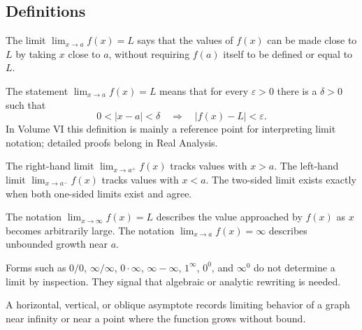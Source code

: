 \subsection*{Definitions}

\begin{definition*}
The limit \(\lim_{x\to a} f(x)=L\) says that the values of \(f(x)\) can be
made close to \(L\) by taking \(x\) close to \(a\), without requiring
\(f(a)\) itself to be defined or equal to \(L\).
\end{definition*}

\begin{definition*}
The statement \(\lim_{x\to a} f(x)=L\) means that for every
\(\varepsilon>0\) there is a \(\delta>0\) such that
\[
  0<|x-a|<\delta
  \quad\Longrightarrow\quad
  |f(x)-L|<\varepsilon.
\]
In Volume VI this definition is mainly a reference point for interpreting
limit notation; detailed proofs belong in Real Analysis.
\end{definition*}

\begin{definition*}
The right-hand limit \(\lim_{x\to a^+} f(x)\) tracks values with \(x>a\).
The left-hand limit \(\lim_{x\to a^-} f(x)\) tracks values with \(x<a\).
The two-sided limit exists exactly when both one-sided limits exist and agree.
\end{definition*}

\begin{definition*}
The notation \(\lim_{x\to\infty} f(x)=L\) describes the value approached by
\(f(x)\) as \(x\) becomes arbitrarily large. The notation
\(\lim_{x\to a} f(x)=\infty\) describes unbounded growth near \(a\).
\end{definition*}

\begin{definition*}
Forms such as \(0/0\), \(\infty/\infty\), \(0\cdot\infty\),
\(\infty-\infty\), \(1^\infty\), \(0^0\), and \(\infty^0\) do not determine
a limit by inspection. They signal that algebraic or analytic rewriting is
needed.
\end{definition*}

\begin{definition*}[Asymptote]
A horizontal, vertical, or oblique asymptote records limiting behavior of a
graph near infinity or near a point where the function grows without bound.
\end{definition*}
